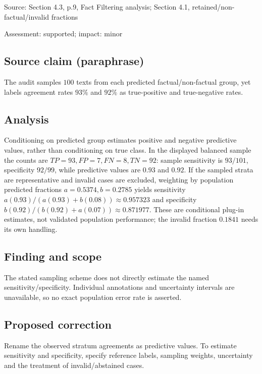 \documentclass[11pt]{article}
\begin{document}
Source: Section 4.3, p.9, Fact Filtering analysis; Section 4.1, retained/non-factual/invalid fractions

Assessment: supported; impact: minor

\subsection*{Source claim (paraphrase)}

The audit samples \(100\) texts from each predicted factual/non-factual group, yet labels agreement rates \(93\%\) and \(92\%\) as true-positive and true-negative rates.

\subsection*{Analysis}

Conditioning on predicted group estimates positive and negative predictive values, rather than conditioning on true class. In the displayed balanced sample the counts are \(TP=93,FP=7,FN=8,TN=92\): sample sensitivity is \(93/101\), specificity \(92/99\), while predictive values are \(0.93\) and \(0.92\). If the sampled strata are representative and invalid cases are excluded, weighting by population predicted fractions \(a=0.5374,b=0.2785\) yields sensitivity \(a(0.93)/(a(0.93)+b(0.08))\approx0.957323\) and specificity \(b(0.92)/(b(0.92)+a(0.07))\approx0.871977\). These are conditional plug-in estimates, not validated population performance; the invalid fraction \(0.1841\) needs its own handling.

\subsection*{Finding and scope}

The stated sampling scheme does not directly estimate the named sensitivity/specificity. Individual annotations and uncertainty intervals are unavailable, so no exact population error rate is asserted.

\subsection*{Proposed correction}

Rename the observed stratum agreements as predictive values. To estimate sensitivity and specificity, specify reference labels, sampling weights, uncertainty and the treatment of invalid/abstained cases.
\end{document}

